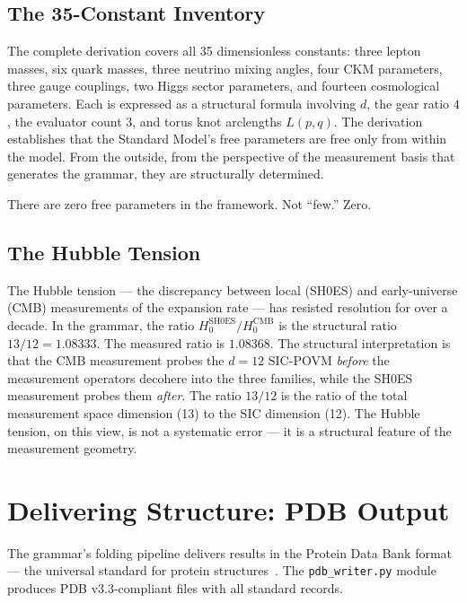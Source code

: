 \documentclass[11pt,a4paper,twocolumn]{article}
\begin{document}
\subsection{The 35-Constant Inventory}

The complete derivation covers all 35 dimensionless constants: three lepton masses, six quark masses, three neutrino mixing angles, four CKM parameters, three gauge couplings, two Higgs sector parameters, and fourteen cosmological parameters. Each is expressed as a structural formula involving $d$, the gear ratio $4$, the evaluator count $3$, and torus knot arclengths $L(p,q)$. The derivation establishes that the Standard Model's free parameters are free only from within the model. From the outside, from the perspective of the measurement basis that generates the grammar, they are structurally determined.

There are zero free parameters in the framework. Not ``few.'' Zero.

\subsection{The Hubble Tension}

The Hubble tension — the discrepancy between local (SH0ES) and early-universe (CMB) measurements of the expansion rate — has resisted resolution for over a decade. In the grammar, the ratio $H_0^{\text{SH0ES}}/H_0^{\text{CMB}}$ is the structural ratio $13/12 = 1.08333$. The measured ratio is $1.08368$. The structural interpretation is that the CMB measurement probes the $d=12$ SIC-POVM \emph{before} the measurement operators decohere into the three families, while the SH0ES measurement probes them \emph{after}. The ratio $13/12$ is the ratio of the total measurement space dimension (13) to the SIC dimension (12). The Hubble tension, on this view, is not a systematic error — it is a structural feature of the measurement geometry.


\section{Delivering Structure: PDB Output}

The grammar's folding pipeline delivers results in the Protein Data Bank format — the universal standard for protein structures~\cite{pdb2012}. The \texttt{pdb\_writer.py} module produces PDB v3.3-compliant files with all standard records.
\end{document}
